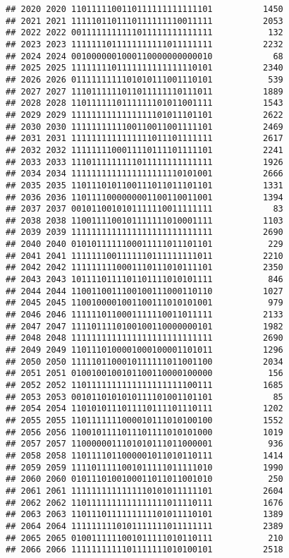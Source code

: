 \documentclass[]{article}
\begin{document}
\begin{verbatim}
## 2020 2020 1101111100110111111111111101          1450
## 2021 2021 1111101101110111111110011111          2053
## 2022 2022 0011111111111011111111111111           132
## 2023 2023 1111111011111111111011111111          2232
## 2024 2024 0010000001000110000000000010            68
## 2025 2025 1111111101111111111111110101          2340
## 2026 2026 0111111111101010111001110101           539
## 2027 2027 1110111111011011111110111011          1889
## 2028 2028 1101111110111111101011001111          1543
## 2029 2029 1111111111111111101011101101          2622
## 2030 2030 1111111111100110011001111101          2469
## 2031 2031 1111111111111111011101111111          2617
## 2032 2032 1111111100011110111101111101          2241
## 2033 2033 1110111111111011111111111111          1926
## 2034 2034 1111111111111111111110101001          2666
## 2035 2035 1101110101100111011011101101          1331
## 2036 2036 1101111000000001100110011001          1394
## 2037 2037 0010110010101111110011111111            83
## 2038 2038 1100111100101111111010001111          1103
## 2039 2039 1111111111111111111111111111          2690
## 2040 2040 0101011111100011111011101101           229
## 2041 2041 1111111001111110111111111011          2210
## 2042 2042 1111111110001110111010111101          2350
## 2043 2043 1011110111101101111010101111           846
## 2044 2044 1100110011100100111000110110          1027
## 2045 2045 1100100001001100111010101001           979
## 2046 2046 1111110110001111110011011111          2133
## 2047 2047 1111011110100100110000000101          1982
## 2048 2048 1111111111111111111111111111          2690
## 2049 2049 1101110100001000100001101011          1296
## 2050 2050 1111101100010111111011001100          2034
## 2051 2051 0100100100101100110000100000           156
## 2052 2052 1101111111111111111111100111          1685
## 2053 2053 0010110101010111101001101101            85
## 2054 2054 1101010111011110111101110111          1202
## 2055 2055 1101111111000010111010100100          1552
## 2056 2056 1100101111011101111010101000          1019
## 2057 2057 1100000011101010111011000001           936
## 2058 2058 1101111011000001011010110111          1414
## 2059 2059 1111011111001011111011111010          1990
## 2060 2060 0101110100100011011011001010           250
## 2061 2061 1111111111111110101011111101          2604
## 2062 2062 1101111111111111111011110111          1676
## 2063 2063 1101110111111111101011110101          1389
## 2064 2064 1111111110101111111011111111          2389
## 2065 2065 0100111111001011111010110111           210
## 2066 2066 1111111111101111111010100101          2518

\end{verbatim}
\end{document}

